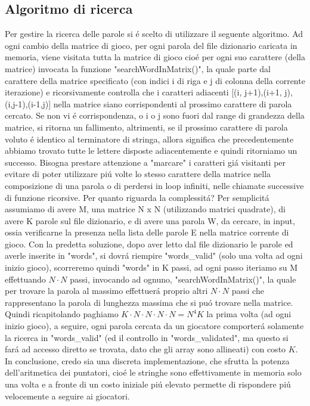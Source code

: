 \subsection{Algoritmo di ricerca}

Per gestire la ricerca delle parole si \'e scelto di utilizzare il seguente algoritmo. Ad ogni cambio della matrice di gioco, per ogni parola del file dizionario caricata in memoria, viene visitata tutta la matrice di gioco cio\'e per ogni suo carattere (della matrice) invocata la funzione "searchWordInMatrix()", la quale parte dal carattere della matrice specificato (con indici i di riga e j di colonna della corrente iterazione) e ricorsivamente controlla che i caratteri adiacenti [(i, j+1),(i+1, j),(i,j-1),(i-1,j)] nella matrice siano corrispondenti al prossimo carattere di parola cercato. Se non vi \'e corrispondenza, o i o j sono fuori dal range di grandezza della matrice, si ritorna un fallimento, altrimenti, se il prossimo carattere di parola voluto \'e identico al terminatore di stringa, allora significa che precedentemente abbiamo trovato tutte le lettere disposte adiacentemente e quindi ritorniamo un successo. Bisogna prestare attenzione a "marcare" i caratteri gi\'a visitanti per evitare di poter utilizzare pi\'u volte lo stesso carattere della matrice nella composizione di una parola o di perdersi in loop infiniti, nelle chiamate successive di funzione ricorsive. Per quanto riguarda la complessit\'a? Per semplicit\'a assumiamo di avere M, una matrice N x N (utilizzando matrici quadrate), di avere K parole sul file dizionario, e di avere una parola W, da cercare, in input, ossia verificarne la presenza nella lista delle parole E nella matrice corrente di gioco. Con la predetta soluzione, dopo aver letto dal file dizionario le parole ed averle inserite in "words", si dovr\'a riempire "words\_valid" (solo una volta ad ogni inizio gioco), scorreremo quindi "words" in K passi, ad ogni passo iteriamo su M effettuando $N \cdot N$ passi, invocando ad ognuno, "searchWordInMatrix()", la quale per trovare la parola al massimo effettuer\'a proprio altri $N \cdot N$ passi che rappresentano la parola di lunghezza massima che si pu\'o trovare nella matrice.
\\
Quindi ricapitolando paghiamo $ K \cdot N \cdot N \cdot N \cdot N = N^4K $ la prima volta (ad ogni inizio gioco), a seguire, ogni parola cercata da un giocatore comporter\'a solamente la ricerca in "words\_valid" (ed il controllo in "words\_validated", ma questo si far\'a ad accesso diretto se trovata, dato che gli array sono allineati) con costo $ K $. In conclusione, credo sia una discreta implementazione, che sfrutta la potenza dell'aritmetica dei puntatori, cio\'e le stringhe sono effettivamente in memoria solo una volta e a fronte di un costo iniziale pi\'u elevato permette di rispondere pi\'u velocemente a seguire ai giocatori.
\\

